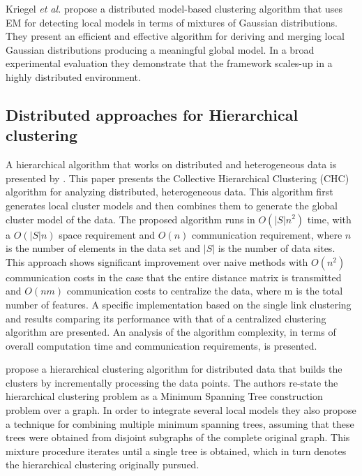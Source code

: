\documentclass[10pt]{article}
\begin{document}
Kriegel \textit{et al.} \citep{KKPS05} propose a distributed model-based clustering algorithm that uses EM for detecting local models in terms of mixtures of Gaussian distributions. They present an efficient and effective algorithm for de\-ri\-ving and merging  local Gaussian distributions producing a meaningful global model. In a broad experimental evaluation they demonstrate that the framework scales-up in a highly distributed environment.

\subsection{Distributed approaches for Hierarchical clustering}

A hierarchical algorithm that works on distributed and heterogeneous data is presented by \citep{JK00}.  This paper presents the Collective Hierarchical Clustering (CHC) algorithm for analyzing distributed, heterogeneous data. This algorithm first generates local cluster models and then combines them to generate the global cluster model of the data. The proposed algorithm runs in $O(|S|n^2)$ time, with a $O(|S|n)$ space requirement and $O(n)$ communication requirement, where $n$ is the number of elements in the data set and $|S|$ is the number of data sites. This approach shows significant improvement over naive methods with $O(n^2)$ communication costs in the case that the entire distance matrix is transmitted and $O(nm)$ communication costs to centralize the data, where m is the total number of features. A specific implementation based on the single link clustering and results comparing its performance with that of a centralized clustering algorithm are presented. An analysis of the algorithm complexity, in terms of overall computation time and communication requirements, is presented.

\citep{JCHAC15} propose a hierarchical clustering algorithm for distributed data that builds the clusters by incrementally processing the data points. The authors re-state the hierarchical clustering problem as a Minimum Spanning Tree construction problem over a graph. In order to integrate several local models they also propose a technique for combining multiple minimum spanning trees, assuming that these trees were obtained from disjoint subgraphs of the complete original graph. This mixture procedure iterates until a single tree is obtained, which in turn denotes the hierarchical clustering originally pursued.
\end{document}
